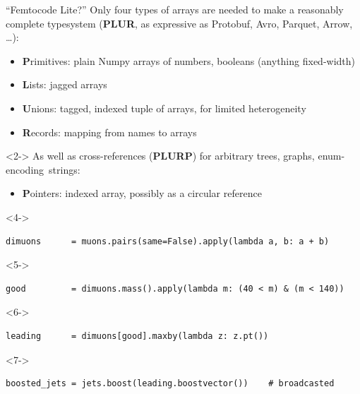 \documentclass[aspectratio=169]{beamer}
\begin{document}
\begin{frame}[fragile]{``Femtocode Lite?''}
\vspace{0.25 cm}
Only four types of arrays are needed to make a reasonably complete typesystem ({\bf PLUR}, as expressive as Protobuf, Avro, Parquet, Arrow, \ldots):
\begin{itemize}
\item {\bf P}rimitives: plain Numpy arrays of numbers, booleans (anything fixed-width)
\item {\bf L}ists: jagged arrays
\item {\bf U}nions: tagged, indexed tuple of arrays, for limited heterogeneity
\item {\bf R}ecords: mapping from names to arrays
\end{itemize}

\vspace{0.25 cm}
\begin{uncoverenv}<2->
As well as cross-references ({\bf PLURP}) for arbitrary trees, graphs, \mbox{enum-encoding strings:\hspace{-0.5 cm}}
\begin{itemize}
\item {\bf P}ointers: indexed array, possibly as a circular reference
\end{itemize}
\end{uncoverenv}

\vspace{0.25 cm}


\small
\begin{uncoverenv}<4->
\begin{verbatim}
dimuons      = muons.pairs(same=False).apply(lambda a, b: a + b)
\end{verbatim}
\end{uncoverenv}
\vspace{-0.35 cm}
\begin{uncoverenv}<5->
\begin{verbatim}
good         = dimuons.mass().apply(lambda m: (40 < m) & (m < 140))
\end{verbatim}
\end{uncoverenv}
\vspace{-0.35 cm}
\begin{uncoverenv}<6->
\begin{verbatim}
leading      = dimuons[good].maxby(lambda z: z.pt())
\end{verbatim}
\end{uncoverenv}
\vspace{-0.35 cm}
\begin{uncoverenv}<7->
\begin{verbatim}
boosted_jets = jets.boost(leading.boostvector())    # broadcasted
\end{verbatim}
\end{uncoverenv}
\end{frame}
\end{document}
